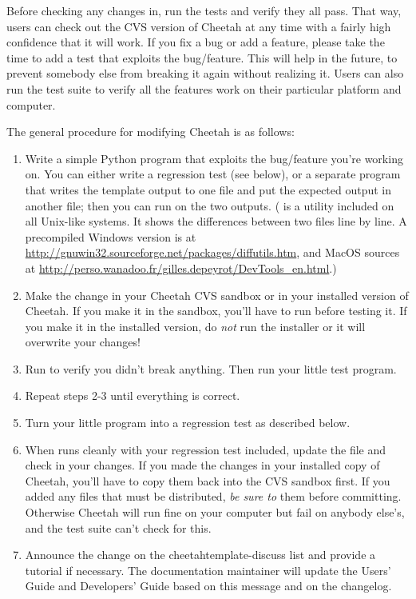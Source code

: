 Before checking any changes in, run the tests and verify they all pass.  That
way, users can check out the CVS version of Cheetah at any time with a fairly
high confidence that it will work.  If you fix a bug or add a feature, please
take the time to add a test that exploits the bug/feature.  This will help in
the future, to prevent somebody else from breaking it again without realizing
it.  Users can also run the test suite to verify all the features work on their
particular platform and computer.

The general procedure for modifying Cheetah is as follows:
\begin{enumerate}
\item Write a simple Python program that exploits the bug/feature you're
    working on.  You can either write a regression test (see below), or a
    separate program that writes the template output to one file and put the
    expected output in another file; then you can run  on the two
    outputs.  ( is a utility included on all Unix-like systems.  It
    shows the differences between two files line by line.  A precompiled
    Windows version is at
    \url{http://gnuwin32.sourceforge.net/packages/diffutils.htm}, and MacOS
    sources at \url{http://perso.wanadoo.fr/gilles.depeyrot/DevTools\_en.html}.)
\item Make the change in your Cheetah CVS sandbox or in your installed
    version of Cheetah.  If you make it in the sandbox, you'll have to run
     before testing it.  If you make it in the
    installed version, do {\em not} run the installer or it will overwrite your
    changes!
\item Run  to verify you didn't break anything.  Then run
    your little test program.
\item Repeat steps 2-3 until everything is correct.
\item Turn your little program into a regression test as described below.
\item When  runs cleanly with your regression test
    included, update the  file and check in your changes.  If you
    made the changes in your installed copy of Cheetah, you'll have to copy
    them back into the CVS sandbox first.  If you added any files that must be
    distributed, {\em be sure to}  them before committing.
    Otherwise Cheetah will run fine on your computer but fail on anybody
    else's, and the test suite can't check for this.
\item Announce the change on the cheetahtemplate-discuss list and provide a
    tutorial if necessary.  The documentation maintainer will update the
    Users' Guide and Developers' Guide based on this message and on the
    changelog.  
\end{enumerate}

